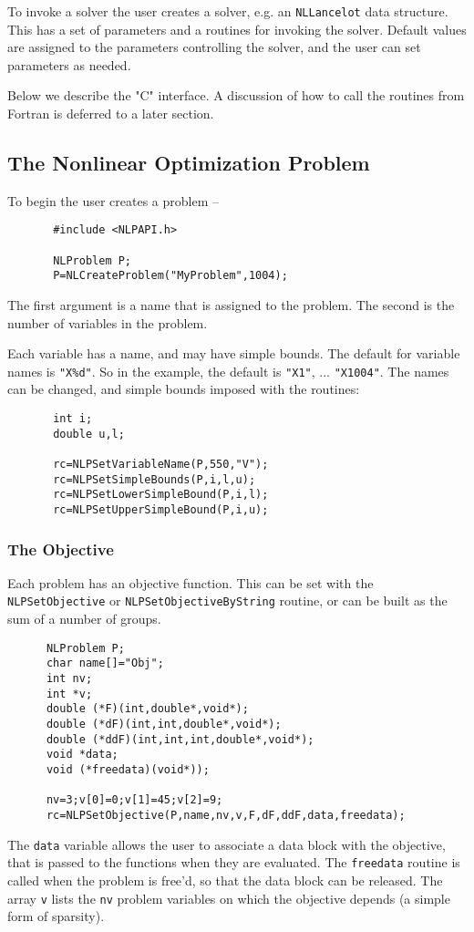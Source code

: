 \documentclass[12pt]{article}
\begin{document}
     To invoke a solver the user creates a solver, e.g. an {\tt NLLancelot} data structure.
    This has a set of parameters and a routines for invoking the solver.
    Default values are assigned to the parameters controlling the solver, and the user 
    can set parameters as needed.

    Below we describe the "C" interface. A discussion of how to call the routines from Fortran 
    is deferred to a later section.

   \subsection{The Nonlinear Optimization Problem}

     To begin the user creates a problem --
     \begin{verbatim}
       #include <NLPAPI.h>

       NLProblem P;
       P=NLCreateProblem("MyProblem",1004);
     \end{verbatim}
     The first argument is a name that is assigned to the problem. The second is the number of variables in 
     the problem.

     Each variable has a name, and may have simple bounds. The default for variable names is {\tt "X\%d"}. So in the
     example, the default is {\tt "X1"}, ... {\tt "X1004"}. The names can be changed, and simple bounds imposed with
     the routines:
     \begin{verbatim}
       int i;
       double u,l;

       rc=NLPSetVariableName(P,550,"V");
       rc=NLPSetSimpleBounds(P,i,l,u);
       rc=NLPSetLowerSimpleBound(P,i,l);
       rc=NLPSetUpperSimpleBound(P,i,u);
     \end{verbatim}

   \subsubsection{The Objective}

     Each problem has an objective function. This can be set with the {\tt NLPSet\-Objective} or
     {\tt NLPSet\-Objective\-ByString} routine, or can be built as the sum of a number of groups.
     \begin{verbatim}
      NLProblem P;
      char name[]="Obj";
      int nv;
      int *v;
      double (*F)(int,double*,void*);
      double (*dF)(int,int,double*,void*);
      double (*ddF)(int,int,int,double*,void*);
      void *data;
      void (*freedata)(void*));

      nv=3;v[0]=0;v[1]=45;v[2]=9;
      rc=NLPSetObjective(P,name,nv,v,F,dF,ddF,data,freedata);
     \end{verbatim}
     The {\tt data} variable allows the user to associate a data block with the objective, that is passed to the 
     functions when they are evaluated. The {\tt freedata} routine is called when the problem is free'd, so that
     the data block can be released. The array {\tt v} lists the {\tt nv} problem variables on which the objective
     depends (a simple form of sparsity).
\end{document}
